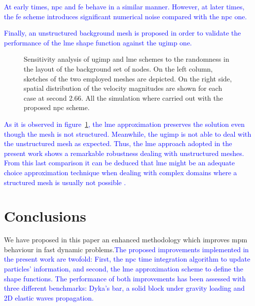 \documentclass[preprint,12pt,a4paper]{elsarticle}
\begin{document}
\textcolor{blue}{At early times, \acrshort{npc} and \acrshort{fe} behave in a similar manner. However, at later times, the \acrshort{fe} scheme introduces significant numerical noise compared with the \acrshort{npc} one. } 

\textcolor{blue}{Finally, an unstructured background mesh is proposed in order to validate the performance of the \acrshort{lme} shape function against the \acrshort{ugimp} one.}
\begin{figure}
  \centering
  \caption{Sensitivity analysis of \acrshort{ugimp} and \acrshort{lme} schemes to the randomness in the layout of the background set of nodes. On the left column, sketches of the two employed meshes are depicted. On the right side, spatial distribution of the velocity magnitudes are shown for each case at second 2.66. All the simulation where carried out with the proposed \acrshort{npc} scheme.}
  \label{fig:Magnitude_velocity_impact_square_structured_unestructured}
\end{figure}
\textcolor{blue}{ As it is observed in figure~\ref{fig:Magnitude_velocity_impact_square_structured_unestructured}, the \acrshort{lme} approximation preserves the solution even though the mesh is not structured. Meanwhile, the \acrshort{ugimp} is not able to deal with the unstructured mesh as expected. %
Thus, the \acrshort{lme} approach adopted in the present work shows a remarkable robustness dealing with unstructured meshes. From this last comparison it can be deduced that \acrshort{lme}  might be an adequate choice approximation technique when dealing with complex domains where a structured mesh is usually not possible .}

\section{Conclusions}
\label{sec:conclusions}
We have proposed in this paper an enhanced methodology which improves \acrfull{mpm} behaviour in fast dynamic problems.\textcolor{blue}{The proposed improvements implemented in the present work are twofold: First, the \acrfull{npc} time integration algorithm to update particles' information, and second, the \acrfull{lme} approximation scheme to define the shape functions. The performance of both improvements has been assessed with three different benchmarks: Dyka's bar, a solid block under gravity loading and 2D elastic waves propagation.}
\end{document}
